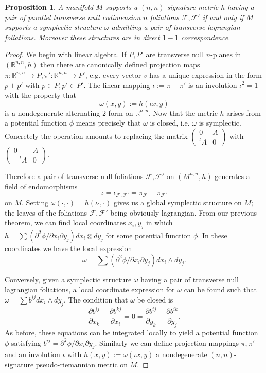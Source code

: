 \documentclass[12pt]{amsart}
\newtheorem{prop}[thm]{Proposition}
\theoremstyle{definition}
\theoremstyle{remark}
\newcommand{\sF}{\mathscr{F}}
\newcommand{\bR}{\mathbb{R}}
\newcommand{\del}{\partial}
\begin{document}
\begin{prop}
A manifold $M$ supports a $(n,n)$-signature metric $h$ having a pair of parallel transverse null codimension $n$ foliations $\sF, \sF'$ if and only if $M$ supports a symplectic structure $\omega$ admitting a pair of transverse lagrangian foliations. Moreover these structures are in direct $1-1$ correspondence.
\end{prop}
\begin{proof}
We begin with linear algebra. If $P,P'$ are transverse null $n$-planes in $(\bR^{n,n},h)$ then there are canonically defined projection maps $\pi: \bR^{n,n} \to P, \pi': \bR^{n,n} \to P'$, e.g. every vector $v$ has a unique expression in the form $p+p'$ with $p\in P, p' \in P'$. The linear mapping $\iota:=\pi - \pi'$ is an involution $\iota^2=1$ with the property that $$\omega(x,y):=h(\iota x, y)$$ is a nondegenerate alternating $2$-form on $\bR^{n,n}$. Now that the metric $h$ arises from a potential function $\phi$ means precisely that $\omega$ is closed, i.e. $\omega$ is symplectic. Concretely the operation amounts to replacing the matrix $\begin{pmatrix}0 & A \\ {}^t A & 0\end{pmatrix}$ with $\begin{pmatrix}0 & A \\ -{}^t A & 0\end{pmatrix}$. 

Therefore a pair of transverse null foliations $\sF, \sF'$ on $(M^{n,n},h)$ generates a field of endomorphisms $$\iota=\iota_{\sF, \sF'}=\pi_{\sF}-\pi_{\sF'}$$ on $M$. Setting $\omega(\cdot, \cdot)=h(\iota \cdot, \cdot)$ gives us a global symplectic structure on $M$; the leaves of the foliations $\sF, \sF'$ being obviously lagrangian. From our previous theorem, we can find local coordinates $x_i, y_j$ in which $h=\sum (\del^2 \phi / \del x_i \del y_j) dx_i \otimes dy_j$ for some potential function $\phi$. In these coordinates we have the local expression $$\omega=\sum(\del^2 \phi / \del x_i \del y_j) dx_i \wedge dy_j.$$

Conversely, given a symplectic structure $\omega$ having a pair of transverse null lagrangian foliations, a local coordinate expression for $\omega$ can be found such that $\omega = \sum b^{ij}dx_i \wedge dy_j$. The condition that $\omega$ be closed is $$\frac{\del b^{ij}}{\del x_k} - \frac{ \del b^{kj}}{\del x_i }=0= \frac{\del b^{ij}}{\del y_k} - \frac{ \del b^{ik}}{\del y_j }.$$ As before, these equations can be integrated locally to yield a potential function $\phi$ satisfying $b^{ij}=\del^2 \phi / \del x_i \del y_j$. Similarly we can define projection mappings $\pi, \pi'$ and an involution $\iota$ with $h(x,y):=\omega(\iota x, y)$ a nondegenerate $(n,n)$-signature pseudo-riemannian metric on $M$.  
\end{proof}
\end{document}
